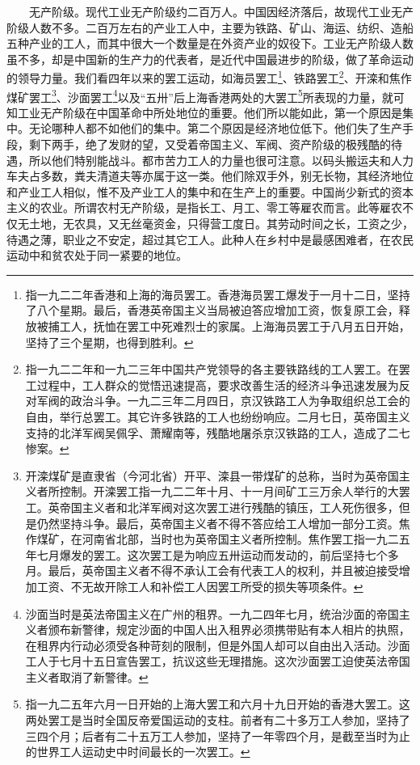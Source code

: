 \documentclass[cn,11pt,chinese]{elegantbook}
\begin{document}
　　无产阶级。现代工业无产阶级约二百万人。中国因经济落后，故现代工业无产阶级人数不多。二百万左右的产业工人中，主要为铁路、矿山、海运、纺织、造船五种产业的工人，而其中很大一个数量是在外资产业的奴役下。工业无产阶级人数虽不多，却是中国新的生产力的代表者，是近代中国最进步的阶级，做了革命运动的领导力量。我们看四年以来的罢工运动，如海员罢工\footnote[12]{ 指一九二二年香港和上海的海员罢工。香港海员罢工爆发于一月十二日，坚持了八个星期。最后，香港英帝国主义当局被迫答应增加工资，恢复原工会，释放被捕工人，抚恤在罢工中死难烈士的家属。上海海员罢工于八月五日开始，坚持了三个星期，也得到胜利。}、铁路罢工\footnote[13]{ 指一九二二年和一九二三年中国共产党领导的各主要铁路线的工人罢工。在罢工过程中，工人群众的觉悟迅速提高，要求改善生活的经济斗争迅速发展为反对军阀的政治斗争。一九二三年二月四日，京汉铁路工人为争取组织总工会的自由，举行总罢工。其它许多铁路的工人也纷纷响应。二月七日，英帝国主义支持的北洋军阀吴佩孚、萧耀南等，残酷地屠杀京汉铁路的工人，造成了二七惨案。}、开滦和焦作煤矿罢工\footnote[14]{ 开滦煤矿是直隶省（今河北省）开平、滦县一带煤矿的总称，当时为英帝国主义者所控制。开滦罢工指一九二二年十月、十一月间矿工三万余人举行的大罢工。英帝国主义者和北洋军阀对这次罢工进行残酷的镇压，工人死伤很多，但是仍然坚持斗争。最后，英帝国主义者不得不答应给工人增加一部分工资。焦作煤矿，在河南省北部，当时也为英帝国主义者所控制。焦作罢工指一九二五年七月爆发的罢工。这次罢工是为响应五卅运动而发动的，前后坚持七个多月。最后，英帝国主义者不得不承认工会有代表工人的权利，并且被迫接受增加工资、不无故开除工人和补偿工人因罢工所受的损失等项条件。}、沙面罢工\footnote[15]{ 沙面当时是英法帝国主义在广州的租界。一九二四年七月，统治沙面的帝国主义者颁布新警律，规定沙面的中国人出入租界必须携带贴有本人相片的执照，在租界内行动必须受各种苛刻的限制，但是外国人却可以自由出入活动。沙面工人于七月十五日宣告罢工，抗议这些无理措施。这次沙面罢工迫使英法帝国主义者取消了新警律。}以及“五卅”后上海香港两处的大罢工\footnote[16]{ 指一九二五年六月一日开始的上海大罢工和六月十九日开始的香港大罢工。这两处罢工是当时全国反帝爱国运动的支柱。前者有二十多万工人参加，坚持了三四个月；后者有二十五万工人参加，坚持了一年零四个月，是截至当时为止的世界工人运动史中时间最长的一次罢工。}所表现的力量，就可知工业无产阶级在中国革命中所处地位的重要。他们所以能如此，第一个原因是集中。无论哪种人都不如他们的集中。第二个原因是经济地位低下。他们失了生产手段，剩下两手，绝了发财的望，又受着帝国主义、军阀、资产阶级的极残酷的待遇，所以他们特别能战斗。都市苦力工人的力量也很可注意。以码头搬运夫和人力车夫占多数，粪夫清道夫等亦属于这一类。他们除双手外，别无长物，其经济地位和产业工人相似，惟不及产业工人的集中和在生产上的重要。中国尚少新式的资本主义的农业。所谓农村无产阶级，是指长工、月工、零工等雇农而言。此等雇农不仅无土地，无农具，又无丝毫资金，只得营工度日。其劳动时间之长，工资之少，待遇之薄，职业之不安定，超过其它工人。此种人在乡村中是最感困难者，在农民运动中和贫农处于同一紧要的地位。\\
\end{document}
